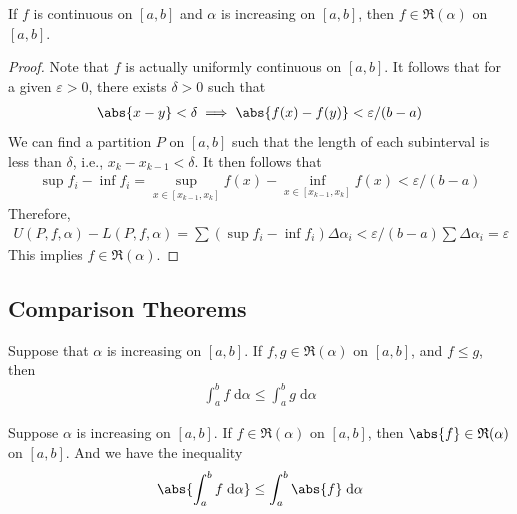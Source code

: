\documentclass[thmcnt=section, 12pt]{elegantbook}
\begin{document}
\begin{theorem} \label{thm:34}
    If $f$ is continuous on $[a, b]$ and $\alpha$ is increasing on $[a, b]$, then $f \in \mathfrak{R}(\alpha)$ on $[a, b]$.
\end{theorem}

\begin{proof}
    Note that $f$ is actually uniformly continuous on $[a, b]$. It follows that for a given $\varepsilon > 0$, there exists $\delta > 0$ such that 
    \begin{align*}
        \abs{x - y} < \delta
        \implies \abs{f(x) - f(y)} < \varepsilon / (b - a)
    \end{align*}
    We can find a partition $P$ on $[a, b]$ such that the length of each subinterval is less than $\delta$, i.e., $ x_k - x_{k-1} < \delta$. It then follows that 
    \begin{align*}
        \sup f_i - \inf f_i
        = \sup_{x \in [x_{k-1},  x_k]} f(x)
        - \inf_{x \in [x_{k-1},  x_k]} f(x)
        < \varepsilon / (b-a)
    \end{align*}
    Therefore, 
    \begin{align*}
        U(P, f, \alpha) - L(P, f, \alpha)
        = \sum (\sup f_i - \inf f_i) \Delta \alpha_i
        < \varepsilon / (b-a) \sum \Delta\alpha_i
        = \varepsilon
    \end{align*}
    This implies $f \in \mathfrak{R}(\alpha)$.
\end{proof}


\subsection{Comparison Theorems}


\begin{theorem} \label{thm:26}
    Suppose that $\alpha$ is increasing on $[a, b]$. If $f, g \in \mathfrak{R}(\alpha)$ on $[a, b]$, and $f \leq g$, then 
    \begin{align*}
        \int_a^b f \;\mathrm{d}\alpha
        \leq \int_a^b g \;\mathrm{d}\alpha
    \end{align*}
\end{theorem}


\begin{theorem} \label{thm:37}
    Suppose $\alpha$ is increasing on $[a, b]$. If $f \in \mathfrak{R}(\alpha)$ on $[a, b]$, then $\abs{f} \in \mathfrak{R}(\alpha)$ on $[a, b]$. And we have the inequality
    \begin{align}
        \abs{\int_a^b f \; \mathrm{d}\alpha}
        \leq \int_a^b \abs{f} \; \mathrm{d}\alpha
        \label{eq:95}
    \end{align}
\end{theorem}
\end{document}
